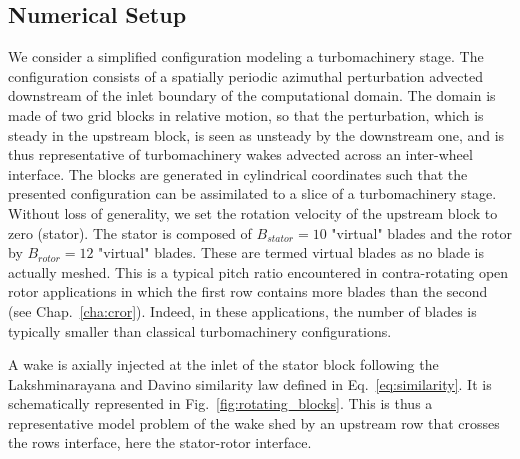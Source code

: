 
\subsection{Numerical Setup}
We consider a simplified configuration modeling a turbomachinery 
stage. The configuration consists of a spatially 
periodic azimuthal perturbation advected downstream 
of the inlet boundary of the computational domain. 
The domain is made of two grid blocks in relative 
motion, so that the perturbation, which is steady 
in the upstream block, is seen as unsteady by the 
downstream one, and is thus representative of 
turbomachinery wakes advected across an inter-wheel interface.
The blocks are generated in cylindrical
coordinates such that the presented configuration
can be assimilated to a slice of 
a turbomachinery stage.
Without loss of generality, 
we set the rotation velocity of the upstream block to zero (stator). 
The stator is composed of $B_{stator} = 10$
"virtual" blades and the rotor by $B_{rotor} = 12$ "virtual" blades.
These are termed virtual blades as no blade is actually meshed.
This is a typical pitch ratio encountered 
in contra-rotating open rotor applications in which 
the first row contains more blades 
than the second (see Chap.~\ref{cha:cror}). Indeed, in
these applications, the number
of blades is typically smaller than classical
turbomachinery configurations. %

A wake is axially injected at the inlet of the
stator block following the Lakshminarayana and
Davino
similarity law defined in Eq.~\eqref{eq:similarity}.
It is schematically represented in 
Fig.~\ref{fig:rotating_blocks}.
This is thus a representative model problem of the wake shed
by an upstream row that crosses the rows interface, 
here the stator-rotor interface.

